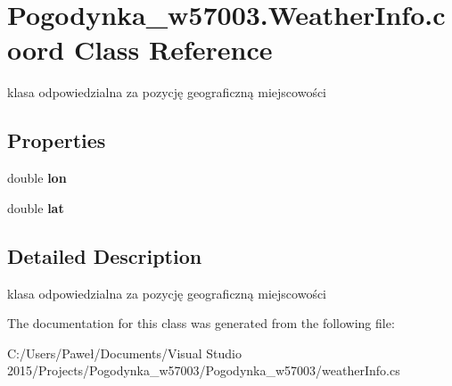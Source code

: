 \hypertarget{class_pogodynka__w57003_1_1_weather_info_1_1coord}{}\section{Pogodynka\+\_\+w57003.\+Weather\+Info.\+coord Class Reference}
\label{class_pogodynka__w57003_1_1_weather_info_1_1coord}


klasa odpowiedzialna za pozycję geograficzną miejscowości  


\subsection*{Properties}
\begin{DoxyCompactItemize}
\item 
\mbox{\label{class_pogodynka__w57003_1_1_weather_info_1_1coord_a6dc94b6e0c88eee7dacdf38e8e502fcb}} 
double {\bfseries lon}
\item 
\mbox{\label{class_pogodynka__w57003_1_1_weather_info_1_1coord_af187780c76202970c1efc4f0c010d0fe}} 
double {\bfseries lat}
\end{DoxyCompactItemize}


\subsection{Detailed Description}
klasa odpowiedzialna za pozycję geograficzną miejscowości 



The documentation for this class was generated from the following file\+:\begin{DoxyCompactItemize}
\item 
C\+:/\+Users/\+Paweł/\+Documents/\+Visual Studio 2015/\+Projects/\+Pogodynka\+\_\+w57003/\+Pogodynka\+\_\+w57003/weather\+Info.\+cs\end{DoxyCompactItemize}
